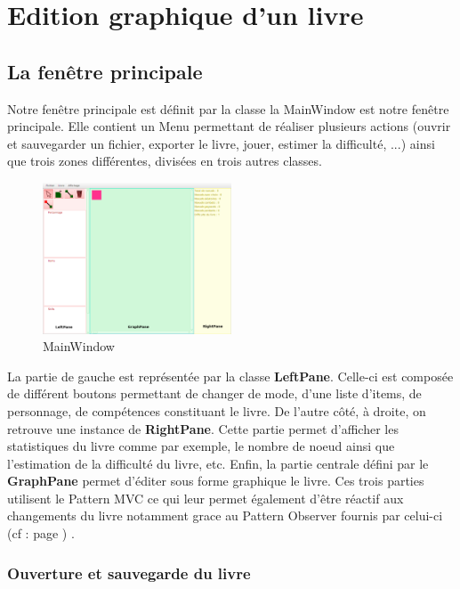 	\section{Edition graphique d'un livre}

		\subsection{La fenêtre principale}

			Notre fenêtre principale est définit par la classe la MainWindow est notre fenêtre principale. Elle contient un Menu permettant de réaliser plusieurs actions (ouvrir et sauvegarder un fichier, exporter le livre, jouer, estimer la difficulté, ...) ainsi que trois zones différentes, divisées en trois autres classes.

			\begin{figure}[H]
				\centering\includegraphics[width=0.50\textwidth]{img/mainwindow.png}
				\caption{MainWindow}
				\label{fig:MainWindow}
			\end{figure}

			La partie de gauche est représentée par la classe \textbf{LeftPane}. Celle-ci est composée de différent boutons permettant de changer de mode, d'une liste d'items, de personnage, de compétences constituant le livre. De l'autre côté, à droite, on retrouve une instance de \textbf{RightPane}. Cette partie permet d'afficher les statistiques du livre comme par exemple, le nombre de noeud ainsi que l'estimation de la difficulté du livre, etc. Enfin, la partie centrale défini par le \textbf{GraphPane} permet d'éditer sous forme graphique le livre. Ces trois parties utilisent le Pattern MVC ce qui leur permet également d'être réactif aux changements du livre notamment grace au Pattern Observer fournis par celui-ci (cf :  page \pageref{subsec:pattern_observer}) .

			\subsubsection{Ouverture et sauvegarde du livre}


